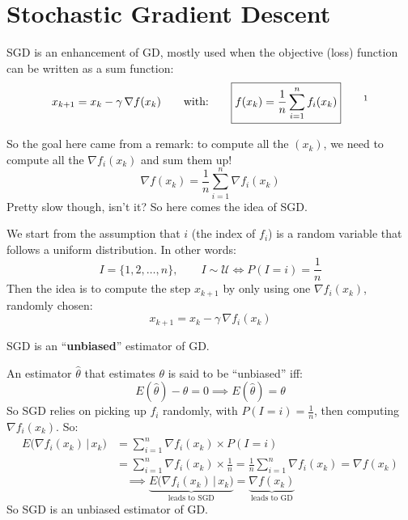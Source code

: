 \chapter{Stochastic Gradient Descent}
\label{ch:sgd}


\Prob[Problematic]
\lettrine[lines=2,findent=2pt,nindent=0pt]{\color{inkred}S}{GD} is an enhancement of GD, mostly used when the objective (loss) function can be written as a sum function:
\[
x_{k+1}=x_k-\gamma\,\nabla f(x_k)\qquad\text{with:}\qquad
\boxed{f(x_k)=\frac{1}{n}\sum_{i=1}^{n}f_i(x_k)}
\qquad\text{\ednotemark}\]

So the goal here came from a remark: to compute all the $(x_k)$, we need to compute all the $\nabla f_i(x_k)$ and sum them up!
\[
\nabla f(x_k)=\frac{1}{n}\sum_{i=1}^{n}\nabla f_i(x_k)
\]
Pretty slow though, isn't it? So here comes the idea of SGD.

We start from the assumption that $i$ (the index of $f_i$) is a random variable that follows a uniform distribution. In other words:
\[
I=\{1,2,\dots,n\},\qquad I\sim\mathcal{U}\iff P(I=i)=\frac{1}{n}
\]
Then the idea is to compute the step $x_{k+1}$ by only using one $\nabla f_i(x_k)$, randomly chosen:
\[
x_{k+1}=x_k-\gamma\,\nabla f_i(x_k)
\]


SGD is an ``\textbf{unbiased}'' estimator of GD.

\Demo[Proof]
An estimator $\hat\theta$ that estimates $\theta$ is said to be ``unbiased'' iff:
\[
E(\hat\theta)-\theta=0\implies\boxed{E(\hat\theta)=\theta}
\]
So SGD relies on picking up $f_i$ randomly, with $P(I=i)=\frac1n$, then computing $\nabla f_i(x_k)$. So:
\begin{align*}
E\bigl(\nabla f_i(x_k)\,\big|\,x_k\bigr)&=\sum_{i=1}^{n}\nabla f_i(x_k)\times P(I=i)\\
&=\sum_{i=1}^{n}\nabla f_i(x_k)\times\frac1n=\frac1n\sum_{i=1}^{n}\nabla f_i(x_k)=\nabla f(x_k)
\end{align*}
\[
\implies\underbrace{E\bigl(\nabla f_i(x_k)\,|\,x_k\bigr)}_{\text{leads to SGD}}=\underbrace{\nabla f(x_k)}_{\text{leads to GD}}
\]
So SGD is an unbiased estimator of GD.\qedmark

